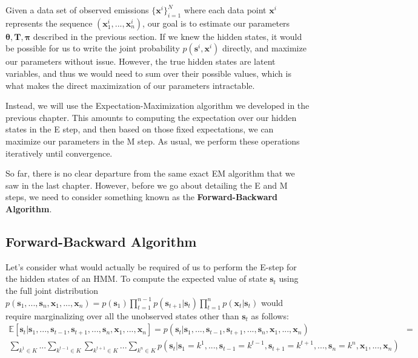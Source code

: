 Given a data set of observed emissions $\{ \textbf{x}^{i} \}_{i=1}^{N}$ where each data point $\textbf{x}^{i}$ represents the sequence $(\textbf{x}_{1}^{i}, ..., \textbf{x}_{n}^{i})$, our goal is to estimate our parameters $\boldsymbol{\theta}, \textbf{T}, \boldsymbol{\pi}$ described in the previous section. If we knew the hidden states, it would be possible for us to write the joint probability $p(\textbf{s}^{i}, \textbf{x}^{i})$ directly, and maximize our parameters without issue. However, the true hidden states are latent variables, and thus we would need to sum over their possible values, which is what makes the direct maximization of our parameters intractable.

Instead, we will use the Expectation-Maximization algorithm we developed in the previous chapter. This amounts to computing the expectation over our hidden states in the E step, and then based on those fixed expectations, we can maximize our parameters in the M step. As usual, we perform these operations iteratively until convergence.

So far, there is no clear departure from the same exact EM algorithm that we saw in the last chapter. However, before we go about detailing the E and M steps, we need to consider something known as the \textbf{Forward-Backward Algorithm}.

\subsection{Forward-Backward Algorithm}
Let's consider what would actually be required of us to perform the E-step for the hidden states of an HMM. To compute the expected value of state $\textbf{s}_t$ using the full joint distribution $p(\textbf{s}_1, ..., \textbf{s}_n, \textbf{x}_1, ..., \textbf{x}_n) = p(\textbf{s}_1) \prod_{t=1}^{n-1} p(\textbf{s}_{t+1} | \textbf{s}_t) \prod_{t=1}^{n} p(\textbf{x}_t | \textbf{s}_t)$ would require marginalizing over all the unobserved states other than $\textbf{s}_{t}$ as follows:
\begin{align*}
	\mathbb{E}[\textbf{s}_t | \textbf{s}_1, ..., \textbf{s}_{t-1}, \textbf{s}_{t + 1}, ..., \textbf{s}_n, \textbf{x}_1, ..., \textbf{x}_n] = p(\textbf{s}_t | \textbf{s}_1, ..., \textbf{s}_{t-1}, \textbf{s}_{t + 1}, ..., \textbf{s}_n, \textbf{x}_1, ..., \textbf{x}_n) &= \\
	\sum_{k^1 \in K} ... \sum_{k^{t-1} \in K} \sum_{k^{t+1} \in K} ... \sum_{k^{n} \in K} p(\textbf{s}_t | \textbf{s}_1=k^1, ..., \textbf{s}_{t-1}=k^{t-1}, \textbf{s}_{t+1}=k^{t+1}, ..., \textbf{s}_n=k^n, \textbf{x}_1, ..., \textbf{x}_n)
\end{align*}

